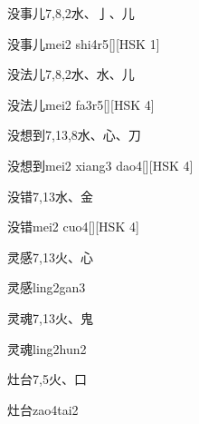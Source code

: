 \begin{entry}{没事儿}{7,8,2}{⽔、⼅、⼉}
  \begin{phonetics}{没事儿}{mei2 shi4r5}[][HSK 1]
  \end{phonetics}
\end{entry}

\begin{entry}{没法儿}{7,8,2}{⽔、⽔、⼉}
  \begin{phonetics}{没法儿}{mei2 fa3r5}[][HSK 4]
  \end{phonetics}
\end{entry}

\begin{entry}{没想到}{7,13,8}{⽔、⼼、⼑}
  \begin{phonetics}{没想到}{mei2 xiang3 dao4}[][HSK 4]
  \end{phonetics}
\end{entry}

\begin{entry}{没错}{7,13}{⽔、⾦}
  \begin{phonetics}{没错}{mei2 cuo4}[][HSK 4]
  \end{phonetics}
\end{entry}

\begin{entry}{灵感}{7,13}{⽕、⼼}
  \begin{phonetics}{灵感}{ling2gan3}
  \end{phonetics}
\end{entry}

\begin{entry}{灵魂}{7,13}{⽕、⿁}
  \begin{phonetics}{灵魂}{ling2hun2}
  \end{phonetics}
\end{entry}

\begin{entry}{灶台}{7,5}{⽕、⼝}
  \begin{phonetics}{灶台}{zao4tai2}
  \end{phonetics}
\end{entry}

